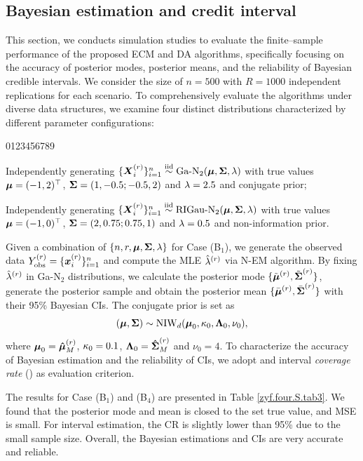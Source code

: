 \subsection{Bayesian estimation and credit interval}

This section, we conducts simulation studies to evaluate the finite--sample performance of the proposed ECM and DA algorithms, specifically focusing on the accuracy of posterior modes, posterior means, and the reliability of Bayesian credible intervals. We consider the size of $n = 500$ with $R = 1000$ independent replications for each scenario. To comprehensively evaluate the algorithms under diverse data structures, we examine four distinct distributions characterized by different parameter configurations:
\begin{namelist}{0123456789}
\item[\hspace*{-0.05cm} Case (B$_1$):] Independently generating $\{{\boldsymbol{X}}_i^{(r)}\}_{i=1}^n \stackrel{{\rm iid}}{\sim} \mbox{Ga-N}_2({\boldsymbol{\mu}}, {\mbox{\boldmath$\Sigma$}}, \lambda)$ with true values ${\boldsymbol{\mu}} = (-1, 2)^\top$, ${\mbox{\boldmath$\Sigma$}} = (1, -0.5; -0.5, 2)$ and $\lambda = 2.5$ and conjugate prior;

\item[\hspace*{-0.05cm} Case (B$_4$):] Independently generating $\{{\boldsymbol{X}}_i^{(r)}\}_{i=1}^n \stackrel{{\rm iid}}{\sim} \mbox{RIGau-N}_2({\boldsymbol{\mu}}, {\mbox{\boldmath$\Sigma$}}, \lambda)$ with true values ${\boldsymbol{\mu}} = (-1, 0)^\top$, ${\mbox{\boldmath$\Sigma$}} = (2, 0.75; 0.75, 1)$ and $\lambda = 0.5$ and non-information prior.
\end{namelist}
Given a combination of $\{n, r, {\boldsymbol{\mu}}, {\mbox{\boldmath$\Sigma$}}, \lambda\}$ for Case (B$_1$), we generate the observed data $Y_{\rm obs}^{(r)} = \{{\boldsymbol{x}}_i^{(r)}\}_{i=1}^n$ and compute the MLE $\hat{\lambda}^{(r)}$ via N-EM algorithm. By fixing $\hat{\lambda}^{(r)}$ in Ga-N$_2$ distributions, we calculate the posterior mode $\{\tilde{{\boldsymbol{\mu}}}^{(r)}, \tilde{{\mbox{\boldmath$\Sigma$}}}^{(r)}\}$, generate the posterior sample and obtain the posterior mean $\{\bar{{\boldsymbol{\mu}}}^{(r)}, \bar{{\mbox{\boldmath$\Sigma$}}}^{(r)}\}$ with their 95\% Bayesian CIs. The conjugate prior is set as
$$
    ({\boldsymbol{\mu}}, {\mbox{\boldmath$\Sigma$}}) \sim \mbox{NIW}_d({\boldsymbol{\mu}}_0, \kappa_0, {\mbox{\boldmath$\Lambda$}}_0, \nu_0),
$$
where ${\boldsymbol{\mu}}_0 = \boldsymbol{\hat{\mu}}_M^{(r)}$, $\kappa_0 = 0.1$, ${\mbox{\boldmath$\Lambda$}}_0 = \boldsymbol{\hat{\Sigma}}_M^{(r)}$ and $\nu_0 = 4$. To characterize the accuracy of Bayesian estimation and the reliability of CIs, we adopt  and interval \textit{coverage rate} () as evaluation criterion.

The results for Case (B$_1$) and (B$_4$) are presented in Table \ref{zyf.four.S.tab3}. We found that the posterior mode and mean is closed to the set true value, and \textsf{MSE} is small. For interval estimation, the \textsf{CR} is slightly lower than 95\% due to the small sample size. Overall, the Bayesian estimations and CIs are very accurate and reliable.

